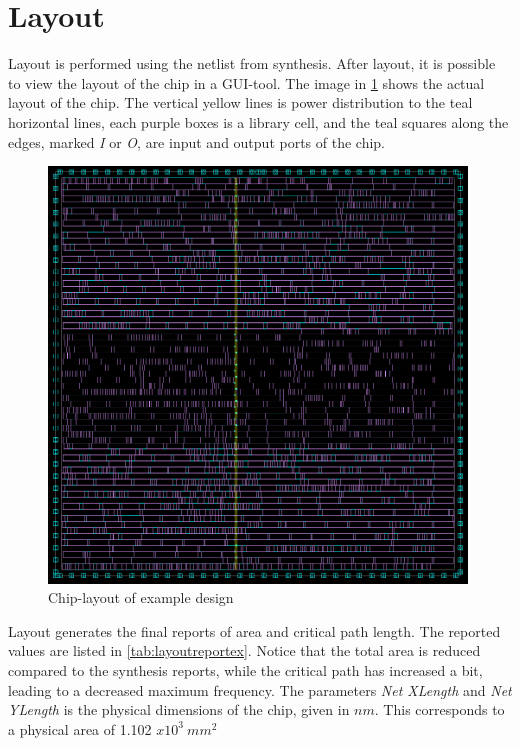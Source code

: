 \section{Layout}
Layout is performed using the netlist from synthesis. After layout, it is possible to view the layout of the chip in a GUI-tool. The image in \cref{fig:layoutcircuit} shows the actual layout of the chip. The vertical yellow lines is power distribution to the teal horizontal lines, each purple boxes is a library cell, and the teal squares along the edges, marked \textit{I} or \textit{O}, are input and output ports of the chip. 
\begin{figure}[hbpt]
\centering
\includegraphics[width=0.99\textwidth]{../figs/LayoutCircuit.png}
\caption{\label{fig:layoutcircuit}Chip-layout of example design}
\end{figure}
Layout generates the final reports of area and critical path length. The reported values are listed in \cref{tab:layoutreportex}. Notice that the total area is reduced compared to the synthesis reports, while the critical path has increased a bit, leading to a decreased maximum frequency. The parameters \textit{Net XLength} and \textit{Net YLength} is the physical dimensions of the chip, given in $nm$. This corresponds to a physical area of 1.102 $x10^3~mm^2$

